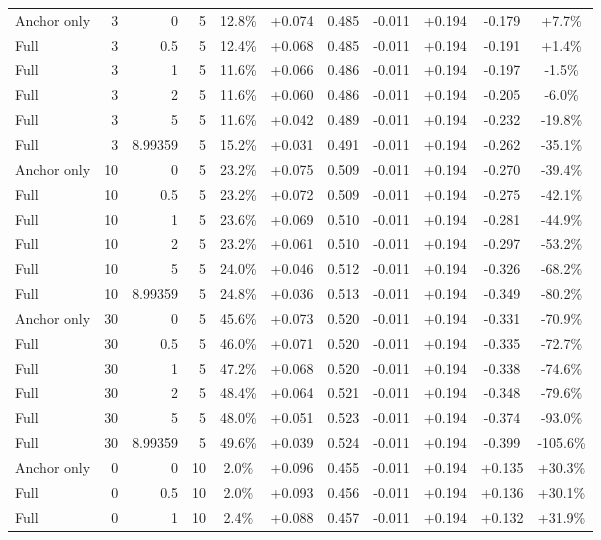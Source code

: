 \begin{table}[htbp]
\begin{tabular}{lrrrccccccc}
Anchor only & 3 & 0 & 5 & 12.8\% & +0.074 & 0.485 & -0.011 & +0.194 & -0.179 & +7.7\% \\
Full & 3 & 0.5 & 5 & 12.4\% & +0.068 & 0.485 & -0.011 & +0.194 & -0.191 & +1.4\% \\
Full & 3 & 1 & 5 & 11.6\% & +0.066 & 0.486 & -0.011 & +0.194 & -0.197 & -1.5\% \\
Full & 3 & 2 & 5 & 11.6\% & +0.060 & 0.486 & -0.011 & +0.194 & -0.205 & -6.0\% \\
Full & 3 & 5 & 5 & 11.6\% & +0.042 & 0.489 & -0.011 & +0.194 & -0.232 & -19.8\% \\
Full & 3 & 8.99359 & 5 & 15.2\% & +0.031 & 0.491 & -0.011 & +0.194 & -0.262 & -35.1\% \\
Anchor only & 10 & 0 & 5 & 23.2\% & +0.075 & 0.509 & -0.011 & +0.194 & -0.270 & -39.4\% \\
Full & 10 & 0.5 & 5 & 23.2\% & +0.072 & 0.509 & -0.011 & +0.194 & -0.275 & -42.1\% \\
Full & 10 & 1 & 5 & 23.6\% & +0.069 & 0.510 & -0.011 & +0.194 & -0.281 & -44.9\% \\
Full & 10 & 2 & 5 & 23.2\% & +0.061 & 0.510 & -0.011 & +0.194 & -0.297 & -53.2\% \\
Full & 10 & 5 & 5 & 24.0\% & +0.046 & 0.512 & -0.011 & +0.194 & -0.326 & -68.2\% \\
Full & 10 & 8.99359 & 5 & 24.8\% & +0.036 & 0.513 & -0.011 & +0.194 & -0.349 & -80.2\% \\
Anchor only & 30 & 0 & 5 & 45.6\% & +0.073 & 0.520 & -0.011 & +0.194 & -0.331 & -70.9\% \\
Full & 30 & 0.5 & 5 & 46.0\% & +0.071 & 0.520 & -0.011 & +0.194 & -0.335 & -72.7\% \\
Full & 30 & 1 & 5 & 47.2\% & +0.068 & 0.520 & -0.011 & +0.194 & -0.338 & -74.6\% \\
Full & 30 & 2 & 5 & 48.4\% & +0.064 & 0.521 & -0.011 & +0.194 & -0.348 & -79.6\% \\
Full & 30 & 5 & 5 & 48.0\% & +0.051 & 0.523 & -0.011 & +0.194 & -0.374 & -93.0\% \\
Full & 30 & 8.99359 & 5 & 49.6\% & +0.039 & 0.524 & -0.011 & +0.194 & -0.399 & -105.6\% \\
Anchor only & 0 & 0 & 10 & 2.0\% & +0.096 & 0.455 & -0.011 & +0.194 & +0.135 & +30.3\% \\
Full & 0 & 0.5 & 10 & 2.0\% & +0.093 & 0.456 & -0.011 & +0.194 & +0.136 & +30.1\% \\
Full & 0 & 1 & 10 & 2.4\% & +0.088 & 0.457 & -0.011 & +0.194 & +0.132 & +31.9\% \\

\end{tabular}
\end{table}
